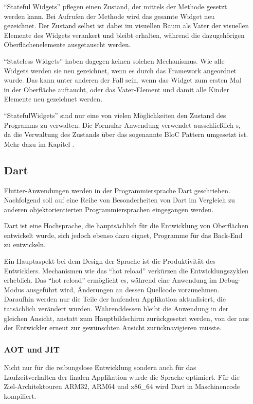\enquote{Stateful Widgets} pflegen einen Zustand, der mittels der Methode  gesetzt werden kann. Bei Aufrufen der Methode wird das gesamte Widget neu gezeichnet. Der Zustand selbst ist dabei im visuellen Baum als Vater der visuellen Elemente des Widgets verankert und bleibt erhalten, während die dazugehörigen Oberflächenelemente ausgetauscht werden.

\enquote{Stateless Widgets} haben dagegen keinen solchen Mechanismus. Wie alle Widgets werden sie neu gezeichnet, wenn es durch das Framework angeordnet wurde. Das kann unter anderen der Fall sein, wenn das Widget zum ersten Mal in der Oberfläche auftaucht, oder das Vater-Element und damit alle Kinder Elemente neu gezeichnet werden.

\enquote{StatefulWidgets} sind nur eine von vielen Möglichkeiten den Zustand des Programms zu verwalten. Die Formular-Anwendung verwendet ausschließlich s, da die Verwaltung des Zustands über das sogenannte BloC Pattern umgesetzt ist. Mehr dazu im Kapitel .

 
\subsection{Dart}

Flutter-Anwendungen werden in der Programmiersprache Dart geschrieben. Nachfolgend soll auf eine Reihe von Besonderheiten von Dart im Vergleich zu anderen objektorientierten Programmiersprachen eingegangen werden.

Dart ist eine Hochsprache, die hauptsächlich für die Entwicklung von Oberflächen entwickelt wurde, sich jedoch ebenso dazu eignet, Programme für das Back-End zu entwickeln.

Ein Hauptaspekt bei dem Design der Sprache ist die Produktivität des Entwicklers. Mechanismen wie das \enquote{hot reload} verkürzen die Entwicklungszyklen erheblich. Das \enquote{hot reload} ermöglicht es, während eine Anwendung im Debug-Modus ausgeführt wird, Änderungen an dessen Quellcode vorzunehmen. Daraufhin werden nur die Teile der laufenden Applikation aktualisiert, die tatsächlich verändert wurden.  Währenddessen bleibt die Anwendung in der gleichen Ansicht, anstatt zum Hauptbildschirm zurückgesetzt werden, von der aus der Entwickler erneut zur gewünschten Ansicht zurücknavigieren müsste.

\subsubsection{AOT und JIT}
Nicht nur für die reibungslose Entwicklung sondern auch für das Laufzeitverhalten der finalen Applikation wurde die Sprache optimiert.
Für die Ziel-Architektouren ARM32, ARM64 und x86_64 wird Dart in Maschinencode kompiliert. 


